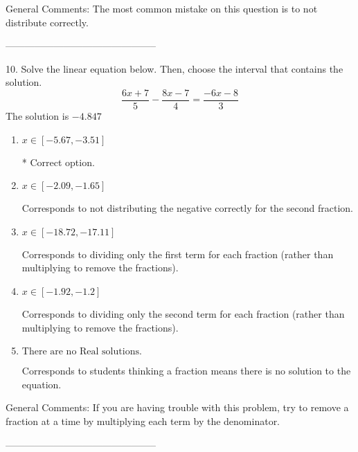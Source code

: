 \documentclass{article}[10pt]
\begin{document}
General Comments: The most common mistake on this question is to not distribute correctly.

-----------------------------------------------

10. Solve the linear equation below. Then, choose the interval that contains the solution.
$$ \frac{6 x + 7}{5} - \frac{8 x - 7}{4} = \frac{-6 x - 8}{3} $$ 
The solution is $ -4.847 $ 

\begin{enumerate}[label=\Alph*.] 
\item $ x \in [-5.67, -3.51] $ 

 * Correct option. 
\item $ x \in [-2.09, -1.65] $ 

  Corresponds to not distributing the negative correctly for the second fraction. 
\item $ x \in [-18.72, -17.11] $ 

  Corresponds to dividing only the first term for each fraction (rather than multiplying to remove the fractions). 
\item $ x \in [-1.92, -1.2] $ 

  Corresponds to dividing only the second term for each fraction (rather than multiplying to remove the fractions). 
\item $ \text{There are no Real solutions.} $ 

 Corresponds to students thinking a fraction means there is no solution to the equation. 
\end{enumerate} 
 
General Comments: If you are having trouble with this problem, try to remove a fraction at a time by multiplying each term by the denominator.

-----------------------------------------------
\end{document}
